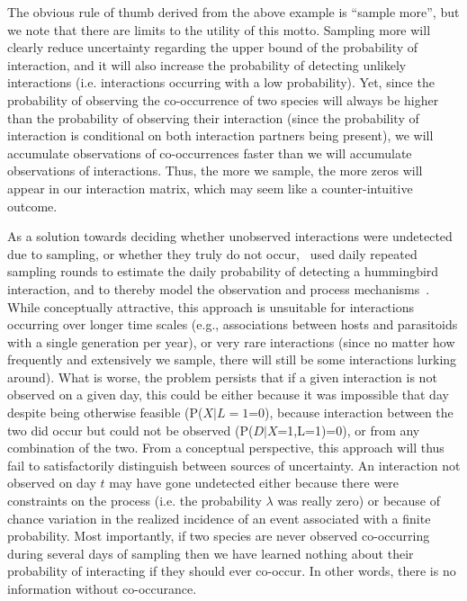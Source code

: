 \documentclass[12pt]{article}
\begin{document}
  The obvious rule of thumb derived from the above example is “sample more”, but we note that there are limits to the utility of this motto. Sampling more will clearly reduce uncertainty regarding the upper bound of the probability of interaction, and it will also increase the probability of detecting unlikely interactions (i.e. interactions occurring with a low probability). Yet, since the probability of observing the co-occurrence of two species will always be higher than the probability of observing their interaction (since the probability of interaction is conditional on both interaction partners being present), we will accumulate observations of co-occurrences faster than we will accumulate observations of interactions. Thus, the more we sample, the more zeros will appear in our interaction matrix, which may seem like a counter-intuitive outcome.

  As a solution towards deciding whether unobserved interactions were undetected due to sampling, or whether they truly do not occur,~\citet{Weinstein2017} used daily repeated sampling rounds to estimate the daily probability of detecting a hummingbird interaction, and to thereby model the observation and process mechanisms~\citep{Weinstein2017}. While conceptually attractive, this approach is unsuitable for interactions occurring over longer time scales (e.g., associations between hosts and parasitoids with a single generation per year), or very rare interactions (since no matter how frequently and extensively we sample, there will still be some interactions lurking around). What is worse, the problem persists that if a given interaction is not observed on a given day, this could be either because it was impossible that day despite being otherwise feasible (P($X|L=1$=0), because interaction between the two did occur but could not be observed (P($D|X$=1,L=1)=0), or from any combination of the two. From a conceptual perspective, this approach will thus fail to satisfactorily distinguish between sources of uncertainty. An interaction not observed on day $t$ may have gone undetected either because there were constraints on the process (i.e. the probability $\lambda$ was really zero) or because of chance variation in the realized incidence of an event associated with a finite probability. Most importantly, if two species are never observed co-occurring during several days of sampling then we have learned nothing about their probability of interacting if they should ever co-occur. In other words, there is no information without co-occurance.
\end{document}
